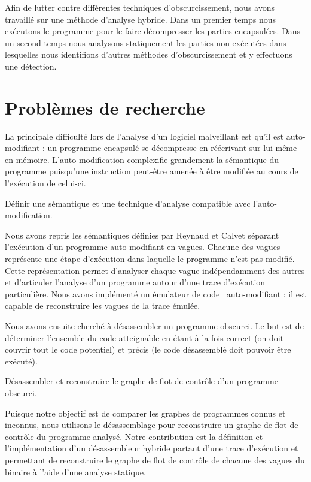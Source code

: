 Afin de lutter contre différentes techniques d'obscurcissement, nous avons travaillé sur une méthode d'analyse hybride.
Dans un premier temps nous exécutons le programme pour le faire décompresser les parties encapsulées. Dans un second temps nous analysons statiquement les parties non exécutées dans lesquelles nous identifions d'autres méthodes d'obscurcissement et y effectuons une détection.

\section{Problèmes de recherche}
La principale difficulté lors de l'analyse d'un logiciel malveillant est qu'il est auto-modifiant : un programme encapsulé se décompresse en réécrivant sur lui-même en mémoire. L'auto-modification complexifie grandement la sémantique du programme puisqu'une instruction peut-être amenée à être modifiée au cours de l'exécution de celui-ci.

\begin{pb}
 Définir une sémantique et une technique d'analyse compatible avec l'auto-modification.
\end{pb}

Nous avons repris les sémantiques définies par Reynaud \cite{Reynaud2010} et Calvet \cite{Calvet2013} séparant l'exécution d'un programme auto-modifiant en vagues. Chacune des vagues représente une étape d'exécution dans laquelle le programme n'est pas modifié. Cette représentation permet d'analyser chaque vague indépendamment des autres et d'articuler l'analyse d'un programme autour d'une trace d'exécution particulière.
Nous avons implémenté un émulateur de code \xq\ auto-modifiant : il est capable de reconstruire les vagues de la trace émulée.


Nous avons ensuite cherché à désassembler un programme obscurci. Le but est de déterminer l'ensemble du code atteignable en étant à la fois correct (on doit couvrir tout le code potentiel) et précis (le code désassemblé doit pouvoir être exécuté). 

\begin{pb}
 Désassembler et reconstruire le graphe de flot de contrôle d'un programme obscurci.
\end{pb}

Puisque notre objectif est de comparer les graphes de programmes connus et inconnus, nous utilisons le désassemblage pour reconstruire un graphe de flot de contrôle du programme analysé.
Notre contribution est la définition et l'implémentation d'un désassembleur hybride partant d'une trace d'exécution et permettant de reconstruire le graphe de flot de contrôle de chacune des vagues du binaire à l'aide d'une analyse statique.

